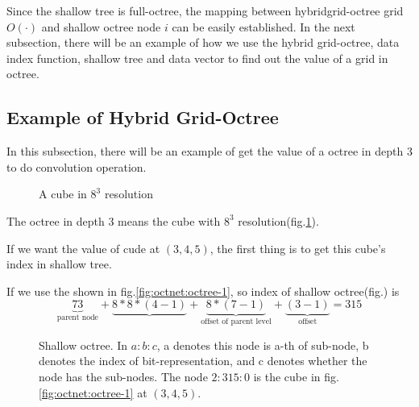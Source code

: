 \documentclass[border=0.5in]{blog}
\newcommand\xaxis{210}
\newcommand\yaxis{-30}
\newcommand\zaxis{90}
\newcommand\topside[3]{
    \fill[fill=yellow, draw=black,shift={(\xaxis:#1)},shift={(\yaxis:#2)},
    shift={(\zaxis:#3)}] (0,0) -- (30:1) -- (0,1) -- (150:1) -- (0,0);
}
\newcommand\leftside[3]{
    \fill[fill=red, draw=black,shift={(\xaxis:#1)},shift={(\yaxis:#2)},
    shift={(\zaxis:#3)}] (0,0) -- (0,-1) -- (210:1) --(150:1)--(0,0);
}
\newcommand\rightside[3]{
    \fill[fill=green, draw=black,shift={(\xaxis:#1)},shift={(\yaxis:#2)},
    shift={(\zaxis:#3)}] (0,0) -- (30:1) -- (-30:1) --(0,-1)--(0,0);
}
\newcommand\cube[3]{
    \topside{#1}{#2}{#3}
    \leftside{#1}{#2}{#3}
    \rightside{#1}{#2}{#3}
}
\begin{document}
    Since the shallow tree is full-octree, the mapping between hybridgrid-octree
    grid $O(\cdot)$ and shallow octree node $i$ can be easily established.
    In the next subsection, there will be an example of how we use the hybrid 
    grid-octree, data index function, shallow tree and data vector to find out
    the value of a grid in octree.

    \subsection{Example of Hybrid Grid-Octree}
    \label{sec:octnet:eg}
    
    In this subsection, there will be an example of get the value of a octree
    in depth 3 to do convolution operation.
    
    \begin{figure}
        \centering
        \caption{A cube in $8^3$ resolution}
        \label{fig:octnet:eg:cude-1}
    \end{figure}

    The octree in depth 3 means the cube with $8^3$ resolution(fig.\ref{fig:octnet:eg:cude-1}).
    
    If we want the value of cude at $(3,4,5)$, the first thing is
    to get this cube's index in shallow tree.
    
    If we use the shown in fig.\ref{fig:octnet:octree-1},
    so index of shallow octree(fig.) is
    \[
      \underbrace{73}_\text{parent node}
    + \underbrace{8 * 8 * (4 - 1)}
    + \underbrace{8 * (7 - 1)}_\text{offset of parent level}
    + \underbrace{(3-1)}_\text{offset} = 315
    \]
    
    \begin{figure}
        \centering
        \caption{Shallow octree. In $a:b:c$, a denotes this node is a-th of sub-node, b denotes the index of bit-representation, and c denotes whether
        the node has the sub-nodes. The node $2:315:0$ is the cube in
        fig.\ref{fig:octnet:octree-1} at $(3,4,5)$.}
        \label{fig:octnet:shallowtree}
    \end{figure}
\end{document}
